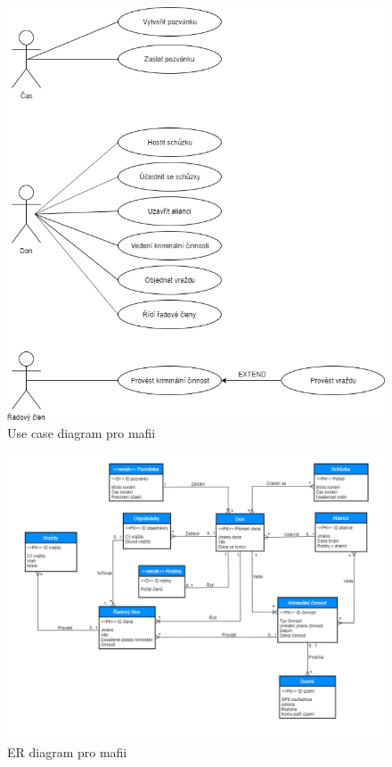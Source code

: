 \documentclass{article}
\begin{document}
\begin{figure}[H]
    \centering
    \includegraphics[scale=0.55, keepaspectratio]{fig/USCD.png}
    \caption{Use case diagram pro mafii}
    \label{fig:UCD}
\end{figure}

\newpage

\begin{figure}
    \centering
    \includegraphics[scale=0.63, keepaspectratio]{fig/ERD.png}
    \caption{ER diagram pro mafii}
    \label{fig:ERD}
\end{figure}
    
\end{document}
